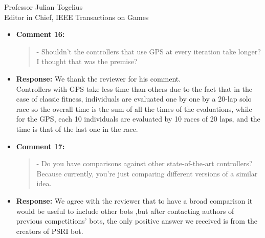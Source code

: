 \documentclass[10pt]{letter} %
\begin{document}
\begin{letter}{Professor Julian Togelius \\ Editor in Chief, IEEE Transactions on Games}
\begin{enumerate}
\begin{itemize}
					The reviewer is right, we run the  controllers for 50 generations in 10 runs and the average time is in Table.5. We also added the range of generations where the best solutions are found.
					We have rewritten the text to clarify it so it reads:
						\textcolor{red}{
						To evaluate the cost of the proposed controllers, we run the evolutionary optimization for 50 generations and 10 runs for all the considered controllers.
						Table.5 shows the average running time and  as additional information, the range of generations where the best individual was found. } 
			\item {\bf Comment 16:}
				\begin{quote}	
				- Shouldn't the controllers that use GPS at every iteration take longer? I thought that was the premise?
				\end{quote}	
			\item {\bf Response:} 
				We thank the reviewer for his comment. \\
				Controllers with GPS take less time than others due to the fact that in the case of classic fitness, individuals are evaluated one by one by a 20-lap solo race so the overall time is the sum of all the times of the evaluations, while for the GPS, each 10 individuals are evaluated by 10 races of 20 laps, and the time is that of the last one in the race.
			\item {\bf Comment 17:}
				\begin{quote}	
					- Do you have comparisons against other state-of-the-art controllers? Because currently, you're just comparing different versions of a similar idea.
				\end{quote}	

			\item {\bf Response:} 
		We agree with the reviewer that to have a broad comparison it would be useful to include other bots ,but after contacting authors of previous competitions' bots, the only positive answer we received is from the creators of PSRI bot.	
			
	\end{itemize}	

\end{enumerate}
 


\end{letter}
\end{document}
